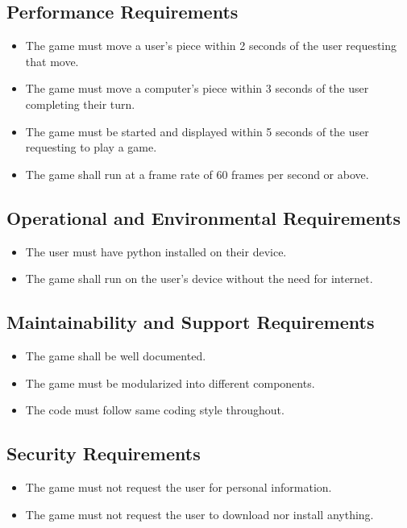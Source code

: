 \documentclass[12pt, titlepage]{article}
\begin{document}
\subsection{Performance Requirements}
\begin{itemize}
    \item The game must move a user's piece within 2 seconds of the user requesting that move.
    \item The game must move a computer's piece within 3 seconds of the user completing their turn.
    \item The game must be started and displayed within 5 seconds of the user requesting to play a game.
    \item The game shall run at a frame rate of 60 frames per second or above.
\end{itemize}

\subsection{Operational and Environmental Requirements}
\begin{itemize}
    \item The user must have python installed on their device.
    \item The game shall run on the user's device without the need for internet.
\end{itemize}

\subsection{Maintainability and Support Requirements}
\begin{itemize}
    \item The game shall be well documented.
    \item The game must be modularized into different components.
    \item The code must follow same coding style throughout. 
\end{itemize}

\subsection{Security Requirements}
\begin{itemize}
    \item The game must not request the user for personal information.
    \item The game must not request the user to download nor install anything.
\end{itemize}
\end{document}
